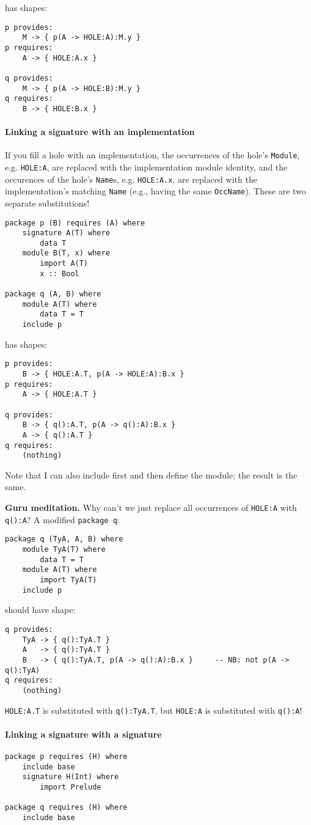 \documentclass{article}
\newenvironment{aside}
  {\begin{mdframed}[style=0,%
      leftline=false,rightline=false,leftmargin=2em,rightmargin=2em,%
          innerleftmargin=0pt,innerrightmargin=0pt,linewidth=0.75pt,%
      skipabove=7pt,skipbelow=7pt]\small}
  {\end{mdframed}}
\begin{document}
has shapes:

\begin{verbatim}
p provides:
    M -> { p(A -> HOLE:A):M.y }
p requires:
    A -> { HOLE:A.x }

q provides:
    M -> { p(A -> HOLE:B):M.y }
q requires:
    B -> { HOLE:B.x }
\end{verbatim}

\paragraph{Linking a signature with an implementation}

If you fill a hole with an implementation, the occurrences of the hole's \verb|Module|, e.g. \verb|HOLE:A|, are replaced with the implementation module identity, and the
occurences of the hole's \verb|Name|s, e.g. \verb|HOLE:A.x|, are replaced with
the implementation's matching \verb|Name| (e.g., having the same \verb|OccName|).
These are two separate substitutions!

\begin{verbatim}
package p (B) requires (A) where
    signature A(T) where
        data T
    module B(T, x) where
        import A(T)
        x :: Bool

package q (A, B) where
    module A(T) where
        data T = T
    include p
\end{verbatim}

has shapes:

\begin{verbatim}
p provides:
    B -> { HOLE:A.T, p(A -> HOLE:A):B.x }
p requires:
    A -> { HOLE:A.T }

q provides:
    B -> { q():A.T, p(A -> q():A):B.x }
    A -> { q():A.T }
q requires:
    (nothing)
\end{verbatim}

Note that I can also include first and then define the module; the
result is the same.

\begin{aside}
\textbf{Guru meditation.}  Why can't we just replace all occurrences of
\verb|HOLE:A| with \verb|q():A|?  A modified \verb|package q|:

\begin{verbatim}
package q (TyA, A, B) where
    module TyA(T) where
        data T = T
    module A(T) where
        import TyA(T)
    include p
\end{verbatim}

should have shape:

\begin{verbatim}
q provides:
    TyA -> { q():TyA.T }
    A   -> { q():TyA.T }
    B   -> { q():TyA.T, p(A -> q():A):B.x }     -- NB: not p(A -> q():TyA)
q requires:
    (nothing)
\end{verbatim}

\verb|HOLE:A.T| is substituted with \verb|q():TyA.T|, but \verb|HOLE:A| is
substituted with \verb|q():A|!
\end{aside}

\paragraph{Linking a signature with a signature}

\begin{verbatim}
package p requires (H) where
    include base
    signature H(Int) where
        import Prelude

package q requires (H) where
    include base
\end{verbatim}
\end{document}
